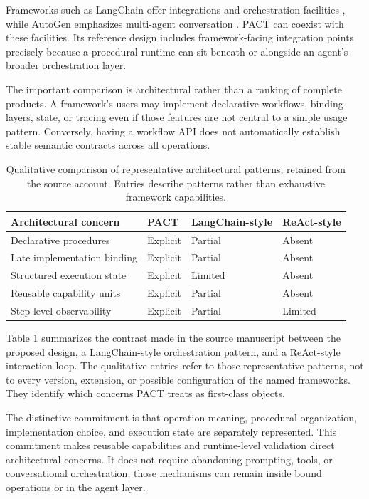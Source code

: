 \documentclass[10pt,twocolumn,a4paper]{article}
\begin{document}
Frameworks such as LangChain offer integrations and orchestration facilities \cite{r7}, while AutoGen emphasizes multi-agent conversation \cite{r8}. PACT can coexist with these facilities. Its reference design includes framework-facing integration points precisely because a procedural runtime can sit beneath or alongside an agent's broader orchestration layer.


The important comparison is architectural rather than a ranking of complete products. A framework's users may implement declarative workflows, binding layers, state, or tracing even if those features are not central to a simple usage pattern. Conversely, having a workflow API does not automatically establish stable semantic contracts across all operations.


\begin{table}[t]
\centering
\caption{Qualitative comparison of representative architectural patterns, retained from the source account. Entries describe patterns rather than exhaustive framework capabilities.}
\label{tab:comparison}
\small
\begin{tabular}{@{}p{7cm}lll@{}}
\toprule
Architectural concern & PACT & LangChain-style & ReAct-style\\
\midrule
Declarative procedures & Explicit & Partial & Absent\\
Late implementation binding & Explicit & Partial & Absent\\
Structured execution state & Explicit & Limited & Absent\\
Reusable capability units & Explicit & Partial & Absent\\
Step-level observability & Explicit & Partial & Limited\\
\bottomrule
\end{tabular}
\end{table}

Table 1 summarizes the contrast made in the source manuscript between the proposed design, a LangChain-style orchestration pattern, and a ReAct-style interaction loop. The qualitative entries refer to those representative patterns, not to every version, extension, or possible configuration of the named frameworks. They identify which concerns PACT treats as first-class objects.


The distinctive commitment is that operation meaning, procedural organization, implementation choice, and execution state are separately represented. This commitment makes reusable capabilities and runtime-level validation direct architectural concerns. It does not require abandoning prompting, tools, or conversational orchestration; those mechanisms can remain inside bound operations or in the agent layer.
\end{document}
